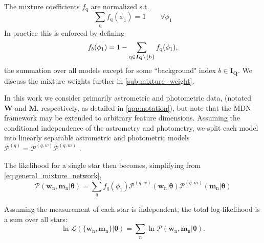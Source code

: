 \documentclass[twocolumn]{aastex631}
\newcommand{\mrm}[1]{\mathrm{#1}}
\newcommand{\mbs}[1]{\boldsymbol{#1}}
\newcommand{\mcal}[1]{\mathcal{#1}}
\newcommand{\pdf}{\mcal{P}}
\newcommand{\nth}[1]{{#1}_{\mrm{n}}}  %
\newcommand{\qth}[1]{{#1}_{\mrm{q}}}  %
\newcommand{\smallcomponent}[2]{#2^{\scriptscriptstyle (#1)}}
\newcommand{\cmp}[2]{\smallcomponent{#1}{#2}}
\begin{document}
        The mixture coefficients $\qth{f}$ are normalized s.t.
        \begin{equation}
            \sum_{\mrm{q}} \qth{f}(\phi_1) = 1 \qquad \forall \phi_1
        \end{equation}
        In practice this is enforced by defining
        \begin{equation} \label{eq:mixture_weight_normalization}
            f_{b}(\phi_1) = 1 - \sum_{\rm{q}\in \mbs{I_Q}\backslash \{b\}} \qth{f}(\phi_1),
        \end{equation}
        the summation over all models except for some ``background" index $b \in \mbs{I_Q}$.
        We discuss the mixture weights further in \autoref{sub:mixture_weight}.

        In this work we consider primarily astrometric and photometric data, (notated $\mbs{W}$ and $\mbs{M}$, respectively, as detailed in \autoref{app:notation}), but note that the MDN framework may be extended to arbitrary feature dimensions.
        Assuming the conditional independence of the astrometry and photometry,
        we split each model into linearly separable astrometric and photometric models $\cmp{q}{\pdf} = \cmp{q,w}{\pdf} \cmp{q,m}{\pdf}$ .

        The likelihood for a single star then becomes, simplifying from \autoref{eq:general_mixture_network},
        \begin{equation} \label{eq:general_model}
            \!\!\!\!\! \pdf(\nth{\mbs{w}}, \! \nth{\mbs{m}} | \mbs{\theta})
                \!=\! \sum_{q} \! f_q(\phi_1) \cmp{q,w}{\pdf}(\nth{\mbs{w}}|\mbs{\theta}) \cmp{q,m}{\pdf}(\nth{\mbs{m}}|\mbs{\theta})
        \end{equation}

        Assuming the measurement of each star is independent, the total
        log-likelihood is a sum over all stars:
        \begin{equation} \label{eq:general_likelihood}
            \ln\mcal{L}\left(\{\nth{\mbs{w}},\nth{\mbs{m}}\} | \mbs{\theta}\right) = \sum_n \ln \pdf(\nth{\mbs{w}}, \nth{\mbs{m}} | \mbs{\theta}).
        \end{equation}
\end{document}
